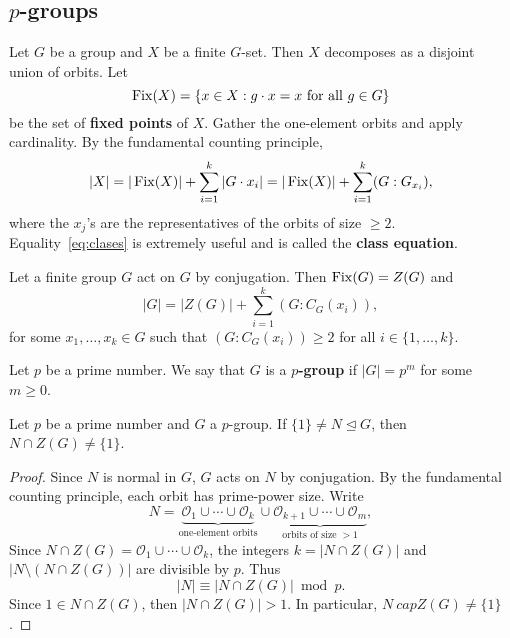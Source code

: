 \subsection{$p$-groups}

Let $G$ be a group and
$X$ be a finite $G$-set. Then $X$ decomposes as a disjoint 
union of orbits. Let 
\[
\operatorname{Fix}(X)=\{x\in X:g\cdot x=x\text{ for all $g\in G$}\}
\]
be the set of \textbf{fixed points} of $X$. Gather  
the one-element orbits and apply cardinality. By the 
fundamental counting principle, 
\begin{equation}
\label{eq:clases}
|X|=|\operatorname{Fix}(X)|+\sum_{i=1}^k|G\cdot x_i|
=|\operatorname{Fix}(X)|+\sum_{i=1}^k(G:G_{x_i}),
\end{equation}
where the $x_j$'s are the representatives
of the orbits of size $\geq2$. Equality~\eqref{eq:clases} is extremely 
useful and is called the 
\textbf{class equation}.

\begin{example}
Let a finite group $G$ act on $G$ by conjugation. 
Then $\operatorname{Fix}(G)=Z(G)$ and 
\[
|G|=|Z(G)|+\sum_{i=1}^k(G:C_G(x_i)),
\]
for some $x_1,\dots,x_k\in G$ such that 
$(G:C_G(x_i))\geq2$ for all $i\in\{1,\dots,k\}$.
\end{example}

\begin{definition}
Let $p$ be a prime number. We say 
that $G$ is a \textbf{$p$-group} if $|G|=p^m$ for some $m\geq0$.
\end{definition}

\begin{theorem}
Let $p$ be a prime number and 
$G$ a $p$-group. If $\{1\}\ne N\unlhd G$, then
$N\cap Z(G)\ne\{1\}$.
\end{theorem}

\begin{proof}
Since $N$ is normal in $G$, $G$ acts on $N$ by conjugation. 
By the fundamental counting principle,
each orbit has prime-power size. Write 
\[
N=\underbrace{\mathcal{O}_1\cup\cdots\cup \mathcal{O}_k}_{\text{one-element orbits}}\cup\underbrace{\mathcal{O}_{k+1}\cup\cdots\cup\mathcal{O}_m}_{\text{orbits of size $>1$}},
\]
Since $N\cap Z(G)=\mathcal{O}_1\cup\cdots\cup\mathcal{O}_k$, 
the integers $k=|N\cap Z(G)|$ and $|N\setminus(N\cap Z(G))|$ are divisible by $p$. Thus 
\[
|N|\equiv|N\cap Z(G)|\bmod p.
\]
Since $1\in N\cap Z(G)$, then
$|N\cap Z(G)|>1$. In particular, $N\
cap Z(G)\ne\{1\}$.
\end{proof}

